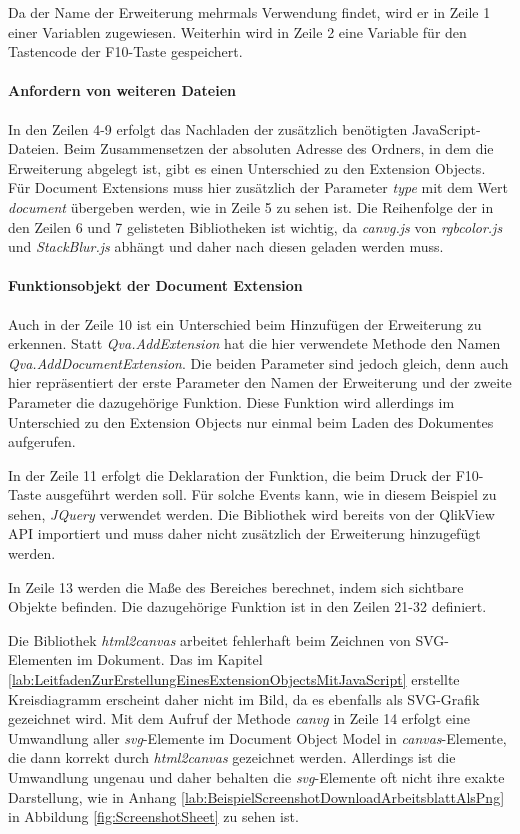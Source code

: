 Da der Name der Erweiterung mehrmals Verwendung findet, wird er in Zeile 1 einer Variablen zugewiesen. Weiterhin wird in Zeile 2 eine Variable für den Tastencode der F10-Taste gespeichert.

\paragraph{Anfordern von weiteren Dateien}

In den Zeilen 4-9 erfolgt das Nachladen der zusätzlich benötigten JavaScript-Dateien. Beim Zusammensetzen der absoluten Adresse des Ordners, in dem die Erweiterung abgelegt ist, gibt es einen Unterschied zu den Extension Objects. Für Document Extensions muss hier zusätzlich der Parameter \textit{type} mit dem Wert \textit{document} übergeben werden, wie in Zeile 5 zu sehen ist. Die Reihenfolge der in den Zeilen 6 und 7 gelisteten Bibliotheken ist wichtig, da \textit{canvg.js} von \textit{rgbcolor.js} und \textit{StackBlur.js} abhängt und daher nach diesen geladen werden muss.

\paragraph{Funktionsobjekt der Document Extension}


Auch in der Zeile 10 ist ein Unterschied beim Hinzufügen der Erweiterung zu erkennen. Statt \textit{Qva.AddExtension} hat die hier verwendete Methode den Namen \textit{Qva.AddDocumentExtension}. Die beiden Parameter sind jedoch gleich, denn auch hier repräsentiert der erste Parameter den Namen der Erweiterung und der zweite Parameter die dazugehörige Funktion. Diese Funktion wird allerdings im Unterschied zu den Extension Objects nur einmal beim Laden des Dokumentes aufgerufen. 

In der Zeile 11 erfolgt die Deklaration der Funktion, die beim Druck der F10-Taste ausgeführt werden soll. Für solche Events kann, wie in diesem Beispiel zu sehen, \textit{JQuery} verwendet werden. Die Bibliothek wird bereits von der QlikView API importiert und muss daher nicht zusätzlich der Erweiterung hinzugefügt werden.

In Zeile 13 werden die Maße des Bereiches berechnet, indem sich sichtbare Objekte befinden. Die dazugehörige Funktion ist in den Zeilen 21-32 definiert.

Die Bibliothek \textit{html2canvas} arbeitet fehlerhaft beim Zeichnen von SVG-Elementen im Dokument. Das im Kapitel \ref{lab:LeitfadenZurErstellungEinesExtensionObjectsMitJavaScript} erstellte Kreisdiagramm erscheint daher nicht im Bild, da es ebenfalls als SVG-Grafik gezeichnet wird. Mit dem Aufruf der Methode \textit{canvg} in Zeile 14 erfolgt eine Umwandlung aller \textit{svg}-Elemente im Document Object Model in \textit{canvas}-Elemente, die dann korrekt durch \textit{html2canvas} gezeichnet werden. Allerdings ist die Umwandlung ungenau und daher behalten die \textit{svg}-Elemente oft nicht ihre exakte Darstellung, wie in Anhang \ref{lab:BeispielScreenshotDownloadArbeitsblattAlsPng} in Abbildung \ref{fig:ScreenshotSheet} zu sehen ist.

